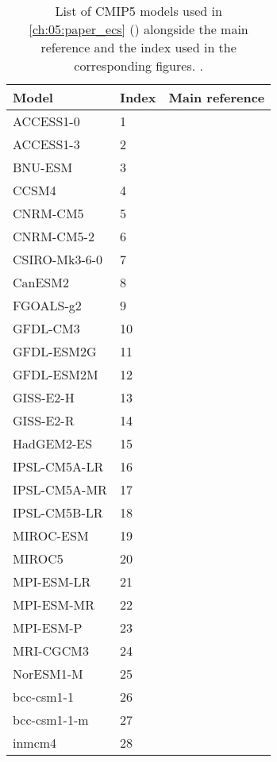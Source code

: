 \begin{table}[p]
  \centering
  \begin{tabulary}{\columnwidth}{L L L}
    \toprule
    Model & Index & Main reference \\
    \midrule
    ACCESS1-0 & 1 & \textcite{Dix2013} \\
    ACCESS1-3 & 2 & \textcite{Dix2013} \\
    BNU-ESM & 3 & \textcite{Ji2014} \\
    CCSM4 & 4 & \textcite{Gent2011, Meehl2012} \\
    CNRM-CM5 & 5 & \textcite{Voldoire2013} \\
    CNRM-CM5-2 & 6 & \textcite{Voldoire2013} \\
    CSIRO-Mk3-6-0 & 7 & \textcite{Rotstayn2012} \\
    CanESM2 & 8 & \textcite{Arora2011} \\
    FGOALS-g2 & 9 & \textcite{Li2013} \\
    GFDL-CM3 & 10 & \textcite{Donner2011} \\
    GFDL-ESM2G & 11 & \textcite{Dunne2012} \\
    GFDL-ESM2M & 12 & \textcite{Dunne2012} \\
    GISS-E2-H & 13 & \textcite{Schmidt2006} \\
    GISS-E2-R & 14 & \textcite{Schmidt2006} \\
    HadGEM2-ES & 15 & \textcite{Collins2011} \\
    IPSL-CM5A-LR & 16 & \textcite{Dufresne2013} \\
    IPSL-CM5A-MR & 17 & \textcite{Dufresne2013} \\
    IPSL-CM5B-LR & 18 & \textcite{Dufresne2013} \\
    MIROC-ESM & 19 & \textcite{Watanabe2011} \\
    MIROC5 & 20 & \textcite{Watanabe2010} \\
    MPI-ESM-LR & 21 & \textcite{Giorgetta2013} \\
    MPI-ESM-MR & 22 & \textcite{Giorgetta2013} \\
    MPI-ESM-P & 23 & \textcite{Giorgetta2013} \\
    MRI-CGCM3 & 24 & \textcite{Yukimoto2012} \\
    NorESM1-M & 25 & \textcite{Bentsen2013, Iversen2013} \\
    bcc-csm1-1 & 26 & \textcite{Wu2014} \\
    bcc-csm1-1-m & 27 & \textcite{Wu2014} \\
    inmcm4 & 28 & \textcite{Volodin2010} \\
    \bottomrule
  \end{tabulary}
  \caption{List of \acs{CMIP}5 models used in \cref{ch:05:paper_ecs}
    () alongside the main reference and the index
    used in the corresponding figures. .}
  \label{tab:app:a:cmip5_models}
\end{table}

